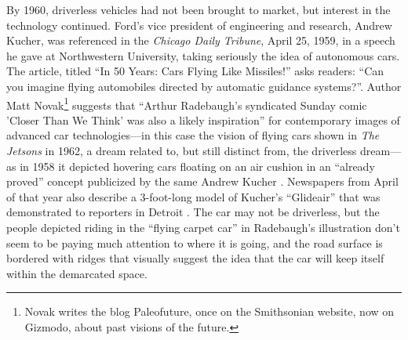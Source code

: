 By 1960, driverless vehicles had not been brought to market, but
interest in the technology continued. Ford's vice president of
engineering and research, Andrew Kucher, was referenced in the \emph{Chicago
Daily Tribune}, April 25, 1959, in a speech he gave at Northwestern
University, taking seriously the idea of autonomous cars. The article,
titled ``In 50 Years: Cars Flying Like Missiles!'' asks readers: ``Can
you imagine flying automobiles directed by automatic guidance
systems?''\cite{tribuneViaPaleo}. Author Matt Novak\footnote{Novak writes the
 blog Paleofuture, once on the Smithsonian website, now on Gizmodo,
 about past visions of the future.} suggests that ``Arthur Radebaugh's syndicated
Sunday comic 'Closer Than We Think' was also a likely inspiration''
for contemporary images of advanced car technologies---in this case
the vision of flying cars shown in \emph{The Jetsons} in 1962, a
dream related to, but still distinct from, the driverless dream---as in
1958 it depicted hovering 
cars floating on an air cushion in an ``already proved'' concept
publicized by the same Andrew Kucher \cite{novakRecapping}. Newspapers
from April of that 
year also describe a 3-foot-long model of Kucher's ``Glideair'' that was
demonstrated to reporters in Detroit \cite{novakFlying}. The car may
not be driverless, 
but the people depicted riding in the ``flying carpet car'' in
Radebaugh's illustration don't seem to be paying much attention to
where it is going, and the road surface is bordered with ridges that
visually suggest the idea that the car will keep itself within the
demarcated space.

